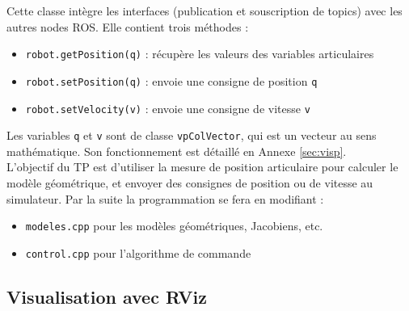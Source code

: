 \documentclass[12pt,a4paper]{article}
\def\vpV{\texttt{vpColVector}}
\begin{document}
Cette classe intègre les interfaces (publication et souscription de topics) avec les autres nodes ROS. Elle contient trois méthodes :
\begin{itemize}
 \item \texttt{robot.getPosition(q)} : récupère les valeurs des variables articulaires
 \item \texttt{robot.setPosition(q)} : envoie une consigne de position \texttt{q}
 \item \texttt{robot.setVelocity(v)} : envoie une consigne de vitesse \texttt{v}
\end{itemize}
Les variables \texttt{q} et \texttt{v} sont de classe \vpV, qui est un vecteur au sens mathématique. Son fonctionnement est détaillé en Annexe \ref{sec:visp}. \\

L'objectif du TP est d'utiliser la mesure de position articulaire pour calculer le modèle géométrique, et envoyer des consignes de position ou de vitesse au simulateur. Par la suite la programmation se fera en modifiant :
\begin{itemize}
\item \texttt{modeles.cpp} pour les modèles géométriques, Jacobiens, etc.
\item \texttt{control.cpp} pour l'algorithme de commande
\end{itemize}


\subsection{Visualisation avec RViz} 
  
\end{document}
